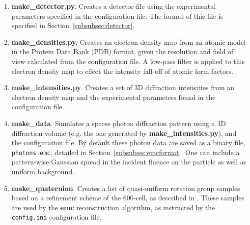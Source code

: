 \documentclass[]{iucr}              %
\begin{document}
\begin{enumerate}
\item{\bf make\_detector.py.} Creates a detector file using the experimental parameters specified in the configuration file. The format of this file is specified in Section~\ref{subsubsec:detector}.
\item{\bf make\_densities.py.} Creates an electron density map from an atomic model in the Protein Data Bank (PDB) format, given the resolution and field of view calculated from the configuration file. A low-pass filter is applied to this electron density map to effect the intensity fall-off of atomic form factors.
\item{\bf make\_intensities.py}. Creates a set of 3D diffraction intensities from an electron density map and the experimental parameters found in the configuration file.  
\item{\bf make\_data}. Simulates a sparse photon diffraction pattern using a 3D diffraction volume (e.g. the one generated by {\bf make\_intensities.py}), and the configuration file. By default these photon data are saved as a binary file, \texttt{photons.emc}, detailed in Section~\ref{subsubsec:emcformat}. One can include a pattern-wise Gaussian spread in the incident fluence on the particle as well as uniform background.
\item{\bf make\_quaternion}. Creates a list of quasi-uniform rotation group samples based on a refinement scheme of the 600-cell, as described in . These samples are used by the {\bf emc} reconstruction algorithm, as instructed by the \texttt{config.ini} configuration file.
\end{enumerate}
\end{document}
